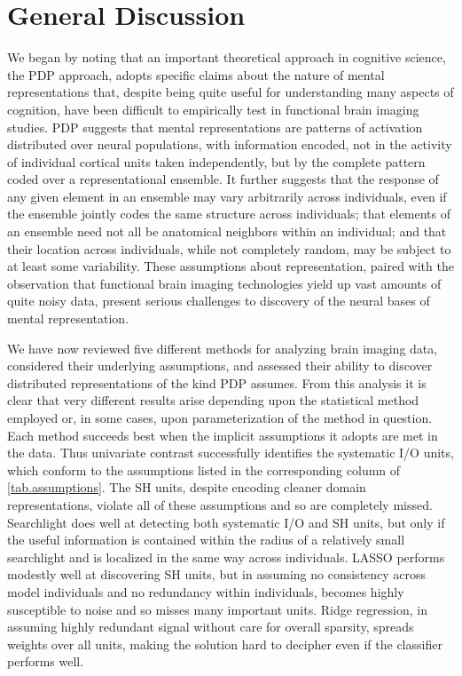 \section{General Discussion}

We began by noting that an important theoretical approach in cognitive science, the PDP approach, adopts specific claims about the nature of mental representations that, despite being quite useful for understanding many aspects of cognition, have been difficult to empirically test in functional brain imaging studies. PDP suggests that mental representations are patterns of activation distributed over neural populations, with information encoded, not in the activity of individual cortical units taken independently, but by the complete pattern coded over a representational ensemble. It further suggests that the response of any given element in an ensemble may vary arbitrarily across individuals, even if the ensemble jointly codes the same structure across individuals; that elements of an ensemble need not all be anatomical neighbors within an individual; and that their location across individuals, while not completely random, may be subject to at least some variability. These assumptions about representation, paired with the observation that functional brain imaging technologies yield up vast amounts of quite noisy data, present serious challenges to  discovery of the neural bases of mental representation.

We have now reviewed five different methods for analyzing brain imaging data, considered their underlying assumptions, and assessed their ability to discover distributed representations of the kind PDP assumes. From this analysis it is clear that very different results arise depending upon the statistical method employed or, in some cases, upon parameterization of the method in question. Each method succeeds best when the implicit assumptions it adopts are met in the data. Thus univariate contrast successfully identifies the systematic I/O units, which conform to the assumptions listed in the corresponding column of \ref{tab.assumptions}. The SH units, despite encoding cleaner domain representations, violate all of these assumptions and so are completely missed. Searchlight does well at detecting both systematic I/O and SH units, but only if the useful information is contained within the radius of a relatively small searchlight and is localized in the same way across individuals. LASSO performs modestly well at discovering SH units, but in assuming no consistency across model individuals and no redundancy within individuals, becomes highly susceptible to noise and so misses many important units. Ridge regression, in assuming highly redundant signal without care for overall sparsity, spreads weights over all units, making the solution hard to decipher even if the classifier performs well.


